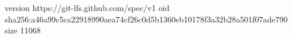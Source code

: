 version https://git-lfs.github.com/spec/v1
oid sha256:a46a99c5ca22918990aea74cf26c0d5b1360eb10178f3a32b28a501f07ade790
size 11068
